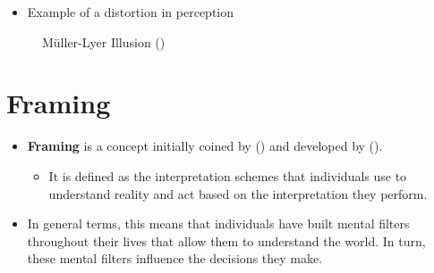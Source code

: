 \documentclass[
  ignorenonframetext,
]{beamer}
\providecommand{\tightlist}{%
  \setlength{\itemsep}{0pt}\setlength{\parskip}{0pt}}\usepackage{longtable,booktabs,array}
\begin{document}
\begin{frame}{}
\label{section-5}
\begin{itemize}
\tightlist
\item
  Example of a distortion in perception
\end{itemize}

\begin{figure}


\caption{\label{fig-muller-lyer-illusion}Müller-Lyer Illusion
()}

\end{figure}%
\end{frame}

\section{Framing}\label{framing}

\begin{frame}{}
\label{section-6}
\begin{itemize}
\item
  \textbf{Framing} is a concept initially coined by
  () and developed by
  ().

  \begin{itemize}
  \tightlist
  \item
    It is defined as the interpretation schemes that individuals use to
    understand reality and act based on the interpretation they perform.
  \end{itemize}
\item
  In general terms, this means that individuals have built mental
  filters throughout their lives that allow them to understand the
  world. In turn, these mental filters influence the decisions they
  make.
\end{itemize}
\end{frame}
\end{document}
